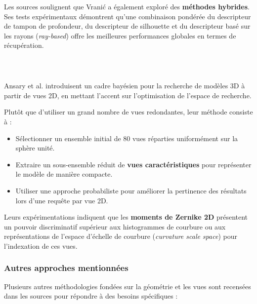 \documentclass[11pt,a4paper,oneside]{report}
\begin{document}
Les sources soulignent que Vranić a également exploré des \textbf{méthodes hybrides}. Ses tests expérimentaux démontrent qu'une combinaison pondérée du descripteur de tampon de profondeur, du descripteur de silhouette et du descripteur basé sur les rayons (\textit{ray-based}) offre les meilleures performances globales en termes de récupération.

\subsubsection{~\cite{ansary9}}

Ansary et al. introduisent un cadre bayésien pour la recherche de modèles 3D à partir de vues 2D, en mettant l'accent sur l'optimisation de l'espace de recherche. 

Plutôt que d'utiliser un grand nombre de vues redondantes, leur méthode consiste à :
\begin{itemize}
    \item Sélectionner un ensemble initial de 80 vues réparties uniformément sur la sphère unité.
    \item Extraire un sous-ensemble réduit de \textbf{vues caractéristiques} pour représenter le modèle de manière compacte.
    \item Utiliser une approche probabiliste pour améliorer la pertinence des résultats lors d'une requête par vue 2D.
\end{itemize}

Leurs expérimentations indiquent que les \textbf{moments de Zernike 2D} présentent un pouvoir discriminatif supérieur aux histogrammes de courbure ou aux représentations de l'espace d'échelle de courbure (\textit{curvature scale space}) pour l'indexation de ces vues.

\subsubsection{Autres approches mentionnées}

Plusieurs autres méthodologies fondées sur la géométrie et les vues sont recensées dans les sources pour répondre à des besoins spécifiques :
\end{document}
